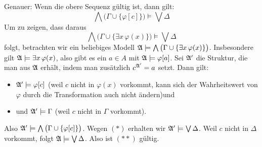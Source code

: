 \documentclass[fontsize=11pt, twoside=false, numbers=autoenddot]{scrbook}
\begin{document}
\begin{description}
    Genauer:
    Wenn die obere Sequenz gültig ist, dann gilt:
    \[
      \tag{$*$}
      \bigwedge \big(\Gamma\cup \{\varphi[c]\}\big) \models
      \bigvee \Delta
    \]
    Um zu zeigen, dass daraus
    \[
      \tag{$**$}
      \bigwedge \big(\Gamma\cup \{\exists x\,\varphi(x)\}\big) \models
      \bigvee \Delta
    \]
    folgt, betrachten wir ein beliebiges Modell $\mathfrak{A} \models \bigwedge \big(\Gamma\cup \{\exists x\,\varphi(x)\}\big)$.
    Insbesondere gilt $\mathfrak{A} \models \exists x\,\varphi(x)$, also gibt es ein $a \in A$ mit $\mathfrak{A} \models \varphi[a]$.
    Sei $\mathfrak{A}'$ die Struktur, die man aus $\mathfrak{A}$ erhält, indem man zusätzlich $c^{\mathfrak{A}'} = a$ setzt.
    Dann gilt:
    \begin{itemize}
      \item 
        $\mathfrak{A}' \models \varphi[c]$ (weil $c$ nicht in $\varphi(x)$ vorkommt, kann sich der Wahrheitswert von $\varphi$ durch die Transformation auch nicht ändern)\quad und
      \item
        und $\mathfrak{A}' \models \Gamma$ (weil $c$ nicht in $\Gamma$ vorkommt).
    \end{itemize}
    Also $\mathfrak{A}' \models \bigwedge \big(\Gamma\cup \{\varphi[c]\}\big)$.
    Wegen $(*)$ erhalten wir 
    $\mathfrak{A}' \models \bigvee \Delta$.
    Weil $c$ nicht in $\Delta$ vorkommt, folgt $\mathfrak{A} \models \bigvee \Delta$.
    Also ist $(**)$ gültig.


\end{description}
\end{document}
